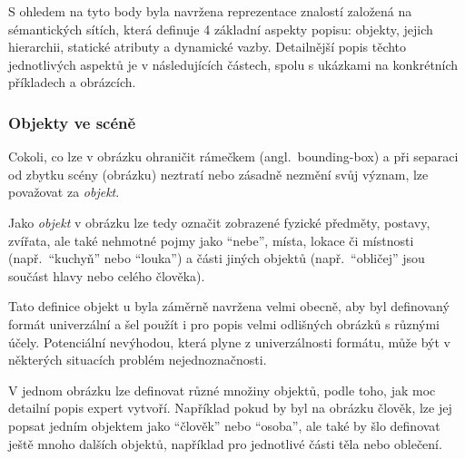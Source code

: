 
S ohledem na tyto body byla navržena reprezentace znalostí založená na sémantických sítích, která definuje 4 základní aspekty popisu: objekty, jejich hierarchii,
statické atributy a dynamické vazby.
Detailnější popis těchto jednotlivých aspektů je v následujících částech, spolu s ukázkami na konkrétních příkladech a obrázcích.

\subsubsection{Objekty ve scéně}\label{subsubsec:objekty_ve_scene}
\newcommand{\objekt}{{\color{red!70!black}\texttt{objekt}}}
Cokoli, co lze v obrázku ohraničit rámečkem (angl.~bounding-box) a při separaci od zbytku scény (obrázku) neztratí nebo zásadně nezmění svůj význam,
lze považovat za \emph{objekt}.

Jako \emph{objekt} v obrázku lze tedy označit zobrazené fyzické předměty, postavy, zvířata, ale také nehmotné pojmy jako \enquote{nebe},
místa, lokace či místnosti (např.~\enquote{kuchyň} nebo \enquote{louka}) a části jiných objektů (např.~\enquote{obličej} jsou součást hlavy nebo celého člověka).

Tato definice objekt u byla záměrně navržena velmi obecně, aby byl definovaný formát univerzální a šel použít i pro popis velmi odlišných obrázků s různými účely.
Potenciální nevýhodou, která plyne z univerzálnosti formátu, může být v některých situacích problém nejednoznačnosti.

V jednom obrázku lze definovat různé množiny objektů, podle toho, jak moc detailní popis expert vytvoří.
Například pokud by byl na obrázku člověk, lze jej popsat jedním objektem jako \enquote{člověk} nebo \enquote{osoba},
ale také by šlo definovat ještě mnoho dalších objektů, například pro jednotlivé části těla nebo oblečení.


